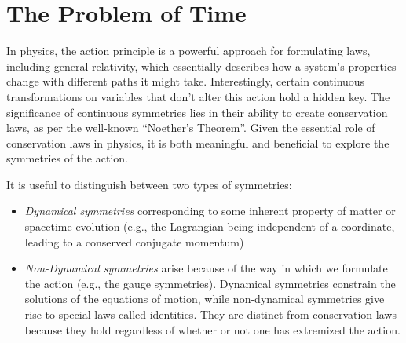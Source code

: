 \chapter{The Problem of Time\label{appen:problemoftime}}

In physics, the action principle is a powerful approach for formulating laws, including general relativity, which essentially describes how a system's properties change with different paths it might take. Interestingly, certain continuous transformations on variables that don't alter this action hold a hidden key.  
The significance of continuous symmetries lies in their ability to create conservation laws, as per the well-known ``Noether's Theorem''. Given the essential role of conservation laws in physics, it is both meaningful and beneficial to explore the symmetries of the action.

It is useful to distinguish between two types of symmetries: 
\begin{itemize}
\item \emph{Dynamical symmetries} corresponding to some inherent property of matter or spacetime evolution (e.g., the
Lagrangian being independent of a coordinate, leading to a conserved conjugate momentum) 
\item \emph{Non-Dynamical symmetries} arise because of the way in which we formulate
the action (e.g., the gauge symmetries). Dynamical symmetries constrain the solutions
of the equations of motion, while non-dynamical symmetries give rise to special laws
called identities. They are distinct from conservation laws because they hold regardless of whether
or not one has extremized the action.
\end{itemize}

